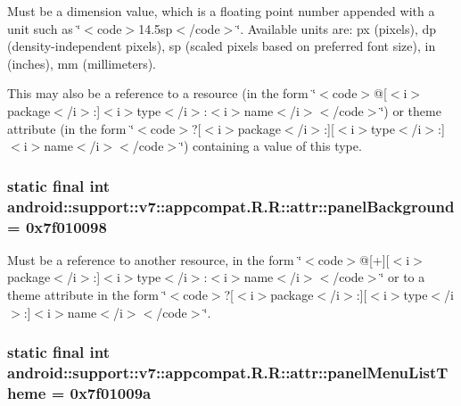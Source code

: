Must be a dimension value, which is a floating point number appended with a unit such as \char`\"{}$<$code$>$14.5sp$<$/code$>$\char`\"{}. Available units are: px (pixels), dp (density-independent pixels), sp (scaled pixels based on preferred font size), in (inches), mm (millimeters). 

This may also be a reference to a resource (in the form \char`\"{}$<$code$>$@\mbox{[}$<$i$>$package$<$/i$>$:\mbox{]}$<$i$>$type$<$/i$>$:$<$i$>$name$<$/i$>$$<$/code$>$\char`\"{}) or theme attribute (in the form \char`\"{}$<$code$>$?\mbox{[}$<$i$>$package$<$/i$>$:\mbox{]}\mbox{[}$<$i$>$type$<$/i$>$:\mbox{]}$<$i$>$name$<$/i$>$$<$/code$>$\char`\"{}) containing a value of this type. \hypertarget{classandroid_1_1support_1_1v7_1_1appcompat_1_1_r_1_1attr_9040cf8b06e439b1e22ba13b69bc3659}{
\subsubsection[{panelBackground}]{\setlength{\rightskip}{0pt plus 5cm}static final int android::support::v7::appcompat.R.R::attr::panelBackground = 0x7f010098}}
\label{classandroid_1_1support_1_1v7_1_1appcompat_1_1_r_1_1attr_9040cf8b06e439b1e22ba13b69bc3659}


Must be a reference to another resource, in the form \char`\"{}$<$code$>$@\mbox{[}+\mbox{]}\mbox{[}$<$i$>$package$<$/i$>$:\mbox{]}$<$i$>$type$<$/i$>$:$<$i$>$name$<$/i$>$$<$/code$>$\char`\"{} or to a theme attribute in the form \char`\"{}$<$code$>$?\mbox{[}$<$i$>$package$<$/i$>$:\mbox{]}\mbox{[}$<$i$>$type$<$/i$>$:\mbox{]}$<$i$>$name$<$/i$>$$<$/code$>$\char`\"{}. \hypertarget{classandroid_1_1support_1_1v7_1_1appcompat_1_1_r_1_1attr_3ee013313f39cd2f252d9288aa5deb4b}{
\subsubsection[{panelMenuListTheme}]{\setlength{\rightskip}{0pt plus 5cm}static final int android::support::v7::appcompat.R.R::attr::panelMenuListTheme = 0x7f01009a}}
\label{classandroid_1_1support_1_1v7_1_1appcompat_1_1_r_1_1attr_3ee013313f39cd2f252d9288aa5deb4b}


